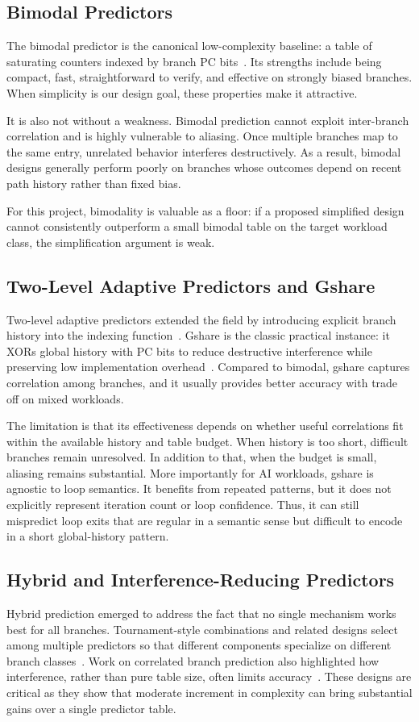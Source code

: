 \documentclass[conference]{IEEEtran}
\begin{document}
\subsection{Bimodal Predictors}
The bimodal predictor is the canonical low-complexity baseline: a table of saturating counters indexed by branch PC bits~\cite{smith_1981}. Its strengths include being compact, fast, straightforward to verify, and effective on strongly biased branches. When simplicity is our design goal, these properties make it attractive.

It is also not without a weakness. Bimodal prediction cannot exploit inter-branch correlation and is highly vulnerable to aliasing. Once multiple branches map to the same entry, unrelated behavior interferes destructively. As a result, bimodal designs generally perform poorly on branches whose outcomes depend on recent path history rather than fixed bias. 

For this project, bimodality is valuable as a floor: if a proposed simplified design cannot consistently outperform a small bimodal table on the target workload class, the simplification argument is weak.

\subsection{Two-Level Adaptive Predictors and Gshare}
Two-level adaptive predictors extended the field by introducing explicit branch history into the indexing function~\cite{yeh_patt_1992}. Gshare is the classic practical instance: it XORs global history with PC bits to reduce destructive interference while preserving low implementation overhead~\cite{mcfarling_1993}. Compared to bimodal, gshare captures correlation among branches, and it usually provides better accuracy with trade off on mixed workloads.

The limitation is that its effectiveness depends on whether useful correlations fit within the available history and table budget. When history is too short, difficult branches remain unresolved. In addition to that, when the budget is small, aliasing remains substantial. More importantly for AI workloads, gshare is agnostic to loop semantics. It benefits from repeated patterns, but it does not explicitly represent iteration count or loop confidence. Thus, it can still mispredict loop exits that are regular in a semantic sense but difficult to encode in a short global-history pattern.

\subsection{Hybrid and Interference-Reducing Predictors}
Hybrid prediction emerged to address the fact that no single mechanism works best for all branches. Tournament-style combinations and related designs select among multiple predictors so that different components specialize on different branch classes~\cite{mcfarling_1993}. Work on correlated branch prediction also highlighted how interference, rather than pure table size, often limits accuracy~\cite{young_1995}. These designs are critical as they show that moderate increment in complexity can bring substantial gains over a single predictor table.
\end{document}
